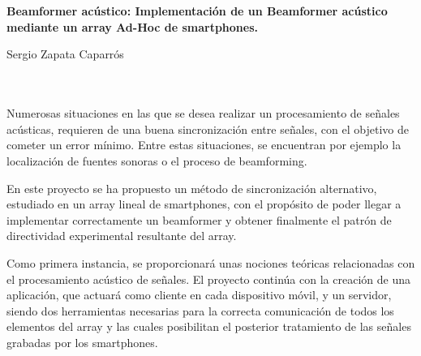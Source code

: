 \chapter*{}






\cleardoublepage
\thispagestyle{empty}

\begin{center}
{\large\bfseries Beamformer acústico: Implementación de un Beamformer acústico mediante un array Ad-Hoc de smartphones.}\\
\end{center}
\begin{center}
Sergio Zapata Caparrós\\
\end{center}

\vspace{0.7cm}
\\

\vspace{0.7cm}
\\

Numerosas situaciones en las que se desea realizar un procesamiento de señales acústicas, requieren de una buena sincronización entre señales, con el objetivo de cometer un error mínimo. Entre estas situaciones, se encuentran por ejemplo la localización de fuentes sonoras o el proceso de beamforming. 

En este proyecto se ha propuesto un método de sincronización alternativo, estudiado en un array lineal de smartphones, con el propósito de poder llegar a implementar correctamente un beamformer y obtener finalmente el patrón de directividad experimental resultante del array.

Como primera instancia, se proporcionará unas nociones teóricas relacionadas con el procesamiento acústico de señales. El proyecto continúa con la creación de una aplicación, que actuará como cliente en cada dispositivo móvil, y un servidor, siendo dos herramientas necesarias para la correcta comunicación de todos los elementos del array y las cuales posibilitan el posterior tratamiento de las señales grabadas por los smartphones.


